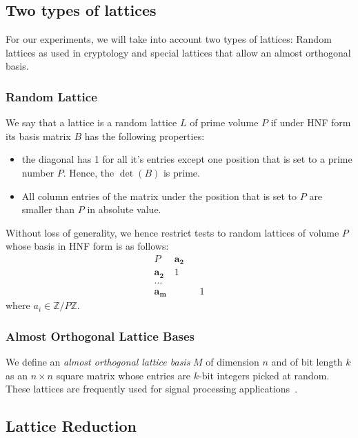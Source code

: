 \documentclass[10pt, a4paper]{article}
\newcommand{\my}[1]{{\color{blue} #1 }}
\renewcommand{\vec}[1]{\mathbf{#1}}
\begin{document}
\subsection{Two types of lattices}
\my{For our experiments, we will take into account two types of lattices: Random lattices as used in cryptology and special lattices that allow an almost orthogonal basis.}

\subsubsection{Random Lattice}

We say that a lattice is a random lattice $L$ of prime volume $P$ if under HNF form its basis matrix $B$ has the following properties:

\begin{itemize}
\item the diagonal has 1 for all it's entries except one position that is set to a prime number $P$. Hence, the $\det(B)$ is prime.
\item All column entries of the matrix under the position that is set to $P$ are smaller than $P$ in absolute value.
\end{itemize}

Without loss of generality, we hence restrict tests to random lattices of volume $P$ whose basis in HNF form is as follows:
$$\begin{array}{ccccc}
P & \vec{a_2} &  & \\
\vec{a_2} & 1&   & \\ 
\dots & &  & \\ 
\vec{a_{m}} & & &1 
\end{array}$$
where $a_i \in \mathbb{Z}/ P\mathbb{Z}$.

\subsubsection{Almost Orthogonal Lattice Bases}

We define an \emph{almost orthogonal lattice basis} $M$ of dimension $n$ and of bit length $k$ as an $n \times n$ square matrix whose entries are $k$-bit integers picked at random. These lattices are frequently used for signal processing applications~\cite{originalJacobiMethodLatticeBasisReduction}.

\subsection{Lattice Reduction}
\end{document}
